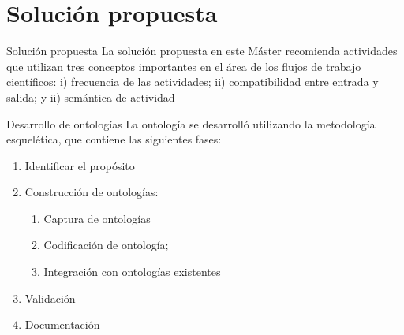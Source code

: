 \section{Solución propuesta}

\begin{frame}		
	\begin{block}{Solución propuesta}
		La solución propuesta en este Máster recomienda actividades que utilizan tres conceptos importantes en el área de los flujos de trabajo científicos: i) frecuencia de las actividades; ii) compatibilidad entre entrada y salida; y ii) semántica de actividad
	\end{block}
\end{frame}


\begin{frame}		
	\begin{block}{Desarrollo de ontologías}
		La ontología se desarrolló utilizando la metodología esquelética, que contiene las siguientes fases:
		\begin{enumerate}
			\item Identificar el propósito
			\item Construcción de ontologías:
			\begin{enumerate}
				\item Captura de ontologías
				\item Codificación de ontología;
				\item Integración con ontologías existentes
			\end{enumerate}
			\item Validación
			\item Documentación
		\end{enumerate}
	\end{block}
\end{frame}


